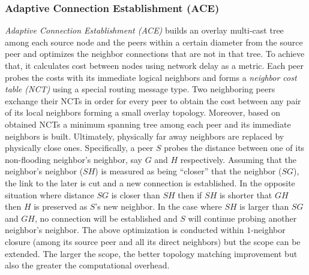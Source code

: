\subsubsection{Adaptive Connection Establishment (ACE)}
\emph{Adaptive Connection Establishment (ACE)} \cite{LZXN2004} builds an
overlay multi-cast tree among each source node and the peers within a certain
diameter from the source peer and optimizes the neighbor connections that are
not in that tree. To achieve that, it calculates cost between nodes using
network delay as a metric. Each peer probes the costs with its immediate logical
neighbors and forms a \emph{neighbor cost table (NCT)} using a special
routing message type. Two neighboring peers exchange their NCTs in order for
every peer to obtain the cost between any pair of its local neighbors forming a
small overlay topology. Moreover, based on obtained NCTs a minimum spanning tree
among each peer and its immediate neighbors is built. Ultimately, physically
far away neighbors are replaced by physically close ones. Specifically, a peer
$S$ probes the distance between one of its non-flooding neighbor's neighbor,
say $G$ and $H$ respectively. Assuming that the neighbor's neighbor ($SH$) is
measured as being ``closer'' that the neighbor ($SG$), the link to the later
is cut and a new connection is established. In the opposite situation where
distance $SG$ is closer than $SH$ then if $SH$ is shorter that $GH$ then $H$ is
preserved as $S$'s new neighbor. In the case where $SH$ is larger than $SG$ and
$GH$, no connection will be established and $S$ will continue probing another
neighbor's neighbor. The above optimization is conducted within $1$-neighbor
closure (among its source peer and all its direct neighbors) but the scope can
be extended. The larger the scope, the better topology matching improvement but
also the greater the computational overhead.

%
%
%


